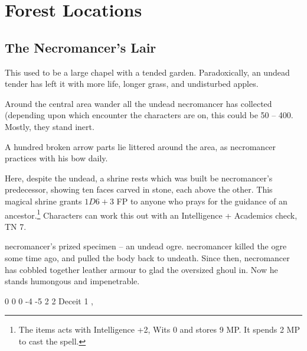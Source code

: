 \section{Forest Locations}

\begin{multicols}{2}

\setcounter{list}{0}

\subsection{The Necromancer's Lair}\label{necromancers_lair}
This used to be a large chapel with a tended garden.  Paradoxically, an undead tender has left it with more life, longer grass, and undisturbed apples.



Around the central area wander all the undead \gls{necromancer} has collected (depending upon which encounter the characters are on, this could be 50 -- 400.  Mostly, they stand inert.

A hundred broken arrow parts lie littered around the area, as \gls{necromancer} practices with his bow daily.



Here, despite the undead, a shrine rests which was built be \gls{necromancer}'s predecessor, showing ten faces carved in stone, each above the other.  This magical shrine grants $1D6 + 3$ FP to anyone who prays for the guidance of an ancestor.\footnote{The items acts with Intelligence +2, Wits 0 and stores 9 MP. It spends 2 MP to cast the spell.}  Characters can work this out with an Intelligence + Academics check, TN 7.


\Gls{necromancer}'s prized specimen -- an undead ogre.
\Gls{necromancer} killed the ogre some time ago, and pulled the body back to undeath.
Since then, \gls{necromancer} has cobbled together leather armour to glad the oversized ghoul in.
Now he stands humongous and impenetrable.


{0}%
{0}%
{{0}%
{-4}%
{-5}}%
{2}%
{2}%
{Deceit 1}%
{\greatclub, \completeleather}%
{}%


\end{multicols}
